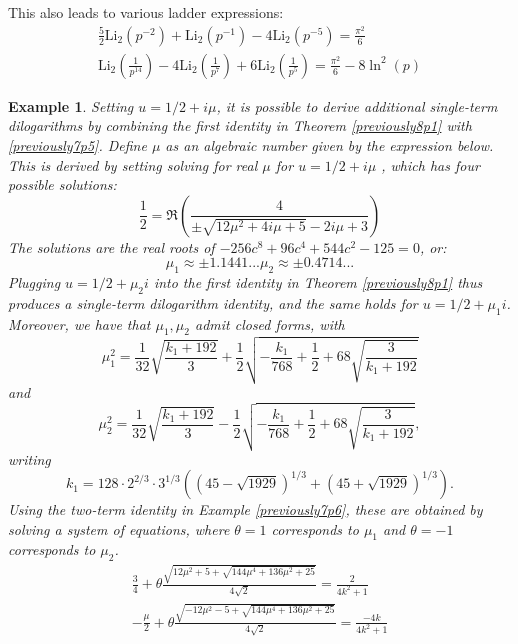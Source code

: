 \documentclass[12pt]{article}
\newtheorem{example}{Example}
\begin{document}
 This also leads to various ladder expressions: 
\begin{equation*}
\begin{aligned}
\frac{5}{2} \mathrm{Li}_2(p^{-2}) + \mathrm{Li}_2(p^{-1}) - 4\mathrm{Li}_2(p^{-5}) = \frac{\pi^2}{6}\\
\mathrm{Li}_2\left(\frac{1}{p^{14}}\right) - 4\mathrm{Li}_2\left(\frac{1}{p^7}\right) + 6\mathrm{Li}_2\left(\frac{1}{p^5}\right) = \frac{\pi^2}{6}-8\ln^2(p)
\end{aligned}
\end{equation*}

\begin{example}
 Setting $u=1/2+i\mu$, it is possible to derive additional single-term dilogarithms by combining the first identity in Theorem 
 \ref{previously8p1} with \eqref{previously7p5}. Define $\mu$ as an algebraic number given by the expression below. This is derived 
 by setting solving for real $\mu$ for $u=1/2+i \mu$ , which has four possible solutions: 
\begin{equation*}
 \frac{1}{2} = \Re\left(\frac{4}{\pm\sqrt{12 \mu^2 + 4 i \mu + 5} - 2 i \mu + 3}\right) 
\end{equation*}
 The solutions are the real roots of $-256 c^8 + 96 c^4 + 544 c^2 - 125=0$, or: 
\begin{equation*}
\mu_1\approx\pm1.1441...\mu_2 \approx \pm 0.4714... 
\end{equation*}
 Plugging $u=1/2+\mu_2i$ into the first identity in Theorem \ref{previously8p1} thus produces a single-term dilogarithm identity, and 
 the same holds for $u=1/2+\mu_1i$. Moreover, we have that $\mu_1,\mu_2$ admit closed forms, with $$ \mu_1^2=\frac{1}{32} 
 \sqrt{\frac{k_1+192}{3}} + \frac{1}{2} \sqrt{-\frac{k_1}{768}+\frac{1}{2} + 68 \sqrt{\frac{3}{k_1+192}}} $$ and $$ \mu_2^2 = 
 \frac{1}{32} \sqrt{\frac{k_1+192}{3}} - \frac{1}{2} \sqrt{-\frac{k_1}{768}+\frac{1}{2} + 68 \sqrt{\frac{3}{k_1+192}}}, $$ writing $$ 
 k_1=128 \cdot 2^{2/3} \cdot 3^{1/3} \left( (45 - \sqrt{1929})^{1/3} + (45 + \sqrt{1929})^{1/3} \right). $$ Using the two-term identity in 
 Example \ref{previously7p6}, these are obtained by solving a system of equations, where $\theta=1$ corresponds to $\mu_1$ and $ 
 \theta=-1$ corresponds to $\mu_2$. 
\begin{equation*}
\begin{aligned}
 \frac{3}{4} + \theta \frac{\sqrt{12 \mu^2 + 5 + \sqrt{144 \mu^4 + 136 \mu^2 + 25}}}{4 \sqrt{2}} = \frac{2}{4k^2+1} \\ 
 - \frac{\mu}{2}+\theta \frac{\sqrt{-12 \mu^2 -5 + \sqrt{144 \mu^4 + 136 \mu^2 + 25}}}{4 \sqrt{2}} = \frac{-4k}{4k^2+1} 

\end{aligned}
\end{equation*}
\end{example}
\end{document}
